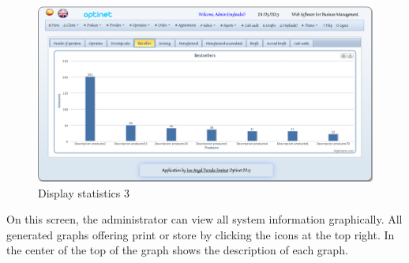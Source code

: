 \documentclass[a4paper,11pt]{book}
\begin{document}
\begin{figure}[!htb]
  \centering
    \includegraphics[scale=0.35]{icapestadisticas3.png}
  \caption{Display statistics 3}
  \label{a}
\end{figure}
On this screen, the administrator can view all system information graphically. All generated graphs offering print or store by clicking the icons at the top right. In the center of the top of the graph shows the description of each graph.
\end{document}
